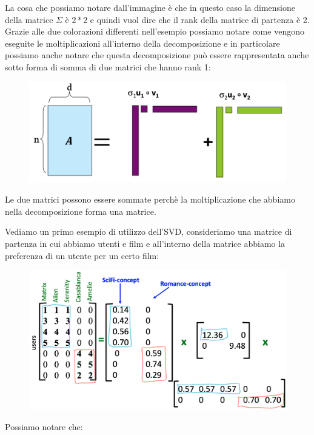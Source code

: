 \documentclass[14pt]{extreport}
\begin{document}
La cosa che possiamo notare dall'immagine è che in questo caso la dimensione della matrice $\Sigma$ è $2*2$ e quindi vuol dire che il rank della
matrice di partenza è 2. Grazie alle due colorazioni differenti nell'esempio possiamo notare come vengono eseguite le moltiplicazioni all'interno
della decomposizione e in particolare possiamo anche notare che questa decomposizione può essere rappresentata anche sotto forma di somma di due
matrici che hanno rank 1:


\begin{figure}[H]
	\centering
	\includegraphics[width=0.7\linewidth]{497.jpeg}
\end{figure}

Le due matrici possono essere sommate perchè la moltiplicazione che abbiamo nella decomposizione forma una matrice.

Vediamo un primo esempio di utilizzo dell'SVD, consideriamo una matrice di partenza in cui abbiamo utenti e film e all'interno della matrice abbiamo
la preferenza di un utente per un certo film:

\begin{figure}[H]
	\centering
	\includegraphics[width=0.7\linewidth]{498.jpeg}
\end{figure}

Possiamo notare che:
\end{document}
